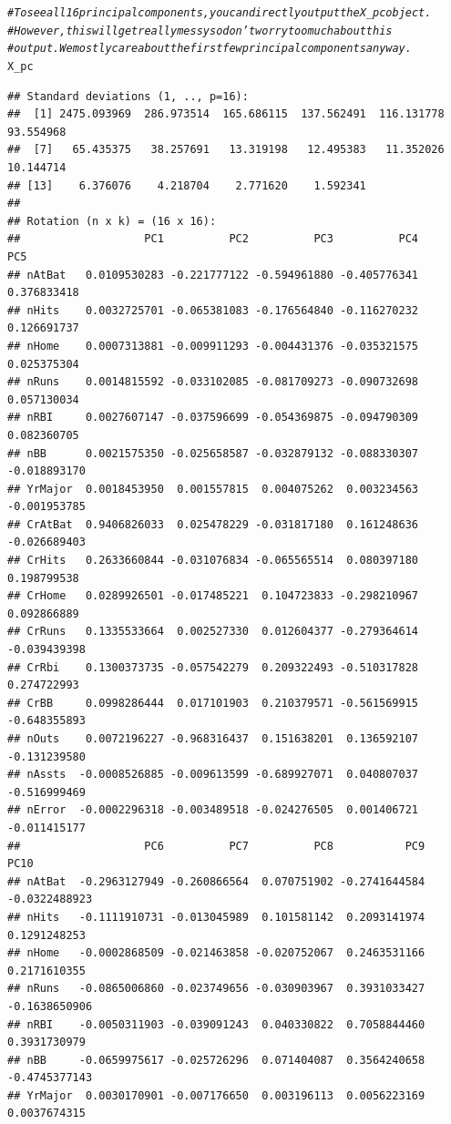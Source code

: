 \documentclass{article}\usepackage[]{graphicx}\usepackage[]{color}
\makeatletter
\newcommand{\hlcom}[1]{\textcolor[rgb]{0.678,0.584,0.686}{\textit{#1}}}%
\newcommand{\hlstd}[1]{\textcolor[rgb]{0.345,0.345,0.345}{#1}}%
\newenvironment{kframe}{%
 \def\at@end@of@kframe{}%
 \ifinner\ifhmode%
  \def\at@end@of@kframe{\end{minipage}}%
  \begin{minipage}{\columnwidth}%
 \fi\fi%
 \def\FrameCommand##1{\hskip\@totalleftmargin \hskip-\fboxsep
 \colorbox{shadecolor}{##1}\hskip-\fboxsep
     \hskip-\linewidth \hskip-\@totalleftmargin \hskip\columnwidth}%
 \MakeFramed {\advance\hsize-\width
   \@totalleftmargin\z@ \linewidth\hsize
   \@setminipage}}%
 {\par\unskip\endMakeFramed%
 \at@end@of@kframe}
\newenvironment{knitrout}{}{} %
\makeatother
\begin{document}
\begin{knitrout}
\begin{kframe}
\begin{alltt}
\hlcom{# To see all 16 principal components, you can directly output the X_pc object.}
\hlcom{# However, this will get really messy so don't worry too much about this}
\hlcom{# output. We mostly care about the first few principal components anyway.}
\hlstd{X_pc}
\end{alltt}
\begin{verbatim}
## Standard deviations (1, .., p=16):
##  [1] 2475.093969  286.973514  165.686115  137.562491  116.131778   93.554968
##  [7]   65.435375   38.257691   13.319198   12.495383   11.352026   10.144714
## [13]    6.376076    4.218704    2.771620    1.592341
## 
## Rotation (n x k) = (16 x 16):
##                   PC1          PC2          PC3          PC4          PC5
## nAtBat   0.0109530283 -0.221777122 -0.594961880 -0.405776341  0.376833418
## nHits    0.0032725701 -0.065381083 -0.176564840 -0.116270232  0.126691737
## nHome    0.0007313881 -0.009911293 -0.004431376 -0.035321575  0.025375304
## nRuns    0.0014815592 -0.033102085 -0.081709273 -0.090732698  0.057130034
## nRBI     0.0027607147 -0.037596699 -0.054369875 -0.094790309  0.082360705
## nBB      0.0021575350 -0.025658587 -0.032879132 -0.088330307 -0.018893170
## YrMajor  0.0018453950  0.001557815  0.004075262  0.003234563 -0.001953785
## CrAtBat  0.9406826033  0.025478229 -0.031817180  0.161248636 -0.026689403
## CrHits   0.2633660844 -0.031076834 -0.065565514  0.080397180  0.198799538
## CrHome   0.0289926501 -0.017485221  0.104723833 -0.298210967  0.092866889
## CrRuns   0.1335533664  0.002527330  0.012604377 -0.279364614 -0.039439398
## CrRbi    0.1300373735 -0.057542279  0.209322493 -0.510317828  0.274722993
## CrBB     0.0998286444  0.017101903  0.210379571 -0.561569915 -0.648355893
## nOuts    0.0072196227 -0.968316437  0.151638201  0.136592107 -0.131239580
## nAssts  -0.0008526885 -0.009613599 -0.689927071  0.040807037 -0.516999469
## nError  -0.0002296318 -0.003489518 -0.024276505  0.001406721 -0.011415177
##                   PC6          PC7          PC8           PC9          PC10
## nAtBat  -0.2963127949 -0.260866564  0.070751902 -0.2741644584 -0.0322488923
## nHits   -0.1111910731 -0.013045989  0.101581142  0.2093141974  0.1291248253
## nHome   -0.0002868509 -0.021463858 -0.020752067  0.2463531166  0.2171610355
## nRuns   -0.0865006860 -0.023749656 -0.030903967  0.3931033427 -0.1638650906
## nRBI    -0.0050311903 -0.039091243  0.040330822  0.7058844460  0.3931730979
## nBB     -0.0659975617 -0.025726296  0.071404087  0.3564240658 -0.4745377143
## YrMajor  0.0030170901 -0.007176650  0.003196113  0.0056223169  0.0037674315

\end{verbatim}
\end{kframe}
\end{knitrout}
\end{document}
